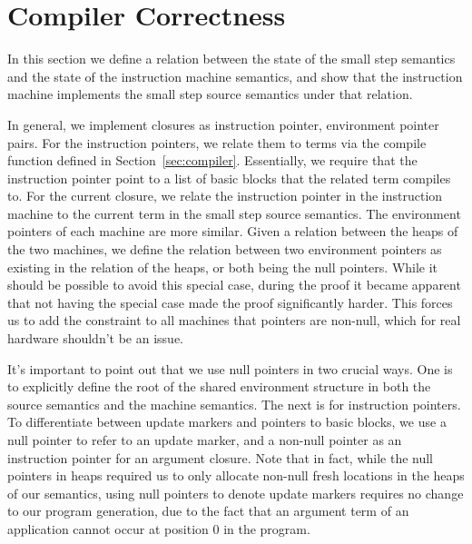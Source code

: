 \section{Compiler Correctness} \label{sec:correctness}

In this section we define a relation between the state of the small step
semantics and the state of the instruction machine semantics, and show that the
instruction machine implements the small step source semantics under that
relation. 

In general, we implement closures as instruction pointer, environment pointer
pairs. For the instruction pointers, we relate them to terms via the compile
function defined in Section~\ref{sec:compiler}. Essentially, we require that the
instruction pointer point to a list of basic blocks that the related term
compiles to. For the current closure, we relate the instruction pointer in the
instruction machine to the current term in the small step source semantics. The
environment pointers of each machine are more similar. Given a relation between
the heaps of the two machines, we define the relation between two environment
pointers as existing in the relation of the heaps, or both being the null
pointers. While it should be possible to avoid this special case, during the
proof it became apparent that not having the special case made the proof
significantly harder. This forces us to add the constraint to all machines that
pointers are non-null, which for real hardware shouldn't be an issue.  

It's important to point out that we use null pointers in two crucial ways. One
is to explicitly define the root of the shared environment structure in both the
source semantics and the machine semantics. The next is for instruction
pointers. To differentiate between update markers and pointers to basic blocks,
we use a null pointer to refer to an update marker, and a non-null pointer as an
instruction pointer for an argument closure. Note that in fact, while the null
pointers in heaps required us to only allocate non-null fresh locations in the
heaps of our semantics, using null pointers to denote update markers requires no
change to our program generation, due to the fact that an argument term of an
application cannot occur at position 0 in the program.

